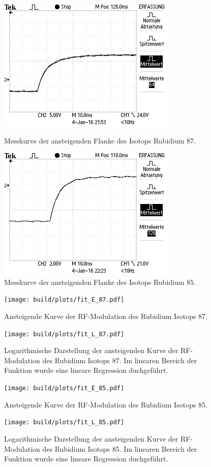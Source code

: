 \begin{figure}[!h]
    \centering
    \includegraphics[width=0.7\linewidth]{data/ALL0002/F0002TEK.jpg}
    \caption{Messkurve der ansteigenden Flanke des Isotops Rubidium 87.}
    \label{fig:exp_87_raw}
    \includegraphics[width=0.7\linewidth]{data/ALL0003/F0003TEK.jpg}
    \caption{Messkurve der ansteigenden Flanke des Isotops Rubidium 85.}
    \label{fig:exp_85_raw}
\end{figure}

\begin{figure}[!h]
    \centering
    \texttt{[image: build/plots/fit\_E\_87.pdf]}
    \caption{Ansteigende Kurve der RF-Modulation des Rubidium Isotops 87.}
    \label{fig:exp_87}
    \texttt{[image: build/plots/fit\_L\_87.pdf]}
    \caption{Logarithmische Darstellung der ansteigenden Kurve der RF-Modulation des Rubidium Isotops 87. Im linearen Bereich der Funktion wurde eine lineare Regression duchgeführt.}
    \label{fig:exp_87_fit}
\end{figure}

\begin{figure}[!h]
    \centering
    \texttt{[image: build/plots/fit\_E\_85.pdf]}
    \caption{Ansteigende Kurve der RF-Modulation des Rubidium Isotops 85.}
    \label{fig:exp_85}
    \texttt{[image: build/plots/fit\_L\_85.pdf]}
    \caption{Logarithmische Darstellung der ansteigenden Kurve der RF-Modulation des Rubidium Isotops 85. Im linearen Bereich der Funktion wurde eine lineare Regression duchgeführt.}
    \label{fig:exp_85_fit}
\end{figure}

